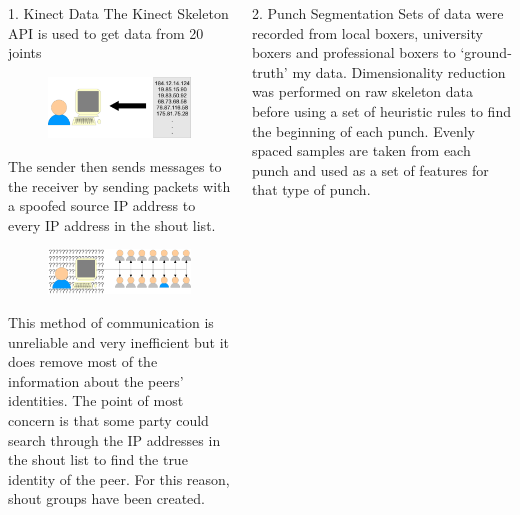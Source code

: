 \documentclass[ %
                    author={Liam O'Shea},
                supervisor={Dr. Sion Hanunna},
                     title={ZeroToHero},
                  subtitle={},
                    degree={Bsc},
                      year={2014} ]{poster}
\begin{document}
\begin{frame}{}
\begin{columns}[t]
    \begin{column}{0.422\linewidth}
    \begin{block}{\normalsize 1. Kinect Data}
    \small The Kinect Skeleton API is used to get data from 20 joints
    \begin{figure}[h]
        \includegraphics{diagrams/poster_get_list.eps}
    \end{figure}
    The sender then sends messages to the receiver by sending packets with a spoofed source IP address to every IP address in the shout list.
    \begin{figure}[h]
        \includegraphics{diagrams/poster_d2.eps}
    \end{figure}
    This method of communication is unreliable and very inefficient but it does remove most of the information about the peers' identities. The point of most concern is that some party could search through the IP addresses in the shout list to find the true identity of the peer. For this reason, shout groups have been created.
    \end{block}
    \end{column}

    \begin{column}{0.422\linewidth}
    \begin{block}{\normalsize 2. Punch Segmentation}
    \small Sets of data were recorded from local boxers, university boxers and professional boxers to `ground-truth' my data. Dimensionality reduction was performed on raw skeleton data before using a set of heuristic rules to find the beginning of each punch.
    Evenly spaced samples are taken from each punch and used as a set of features for that type of punch.


\end{block}
\end{column}
\end{columns}
\end{frame}
\end{document}
